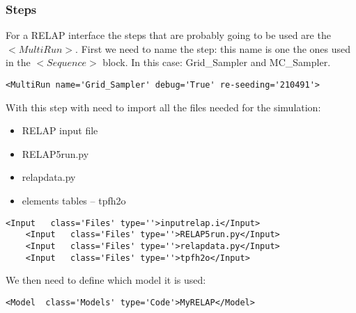 \subsubsection{Steps}
For a RELAP interface the steps that are probably going to be used are the $<MultiRun>$. 
First we need to name the step: this name is one the ones used in the $<Sequence>$ block. In this case: Grid\_Sampler and MC\_Sampler.
\begin{lstlisting}[style=XML]
     <MultiRun name='Grid_Sampler' debug='True' re-seeding='210491'>
\end{lstlisting}
With this step with need to import all the files needed for the simulation:
\begin{itemize}
\item RELAP input file
\item RELAP5run.py
\item relapdata.py
\item elements tables -- tpfh2o 
\end{itemize}
\begin{lstlisting}[style=XML]
    <Input   class='Files' type=''>inputrelap.i</Input>
    <Input   class='Files' type=''>RELAP5run.py</Input>
    <Input   class='Files' type=''>relapdata.py</Input>
    <Input   class='Files' type=''>tpfh2o</Input>
\end{lstlisting}
We then need to define which model it is used:
\begin{lstlisting}[style=XML]
    <Model  class='Models' type='Code'>MyRELAP</Model>
\end{lstlisting}

















